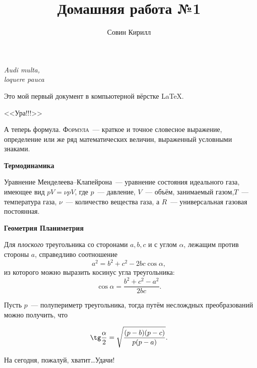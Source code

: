 \documentclass[12pt]{article}
\title{Домашняя работа №1}
\author{Совин Кирилл}
\date{}
\begin{document}
	\maketitle
	\begin{flushright}
		\textit{Audi multa,\\
			loquere pauca}	
	\end{flushright}

	\vspace{20pt}

	Это мой первый документ в компьютерной вёрстке \LaTeX.

	\begin{center}
		\huge{\textsf{<<Ура!!!>>} }\\
	\end{center}

	А теперь формула. \textsc{Формула}~--- краткое и точное словесное выражение, определение или же ряд математических величин, выраженный условными знаками.
	\vspace{15pt}

	\hspace{28pt}  {\Large\textbf{Термодинамика}}

	Уравнение Менделеева--Клапейрона~--- уравнение состояния идеального газа, имеющее вид $pV = \nu pV$, где $p$~--- давление, $V$~--- объём, занимаемый газом,$T$~--- температура газа, $\nu$~--- количество вещества газа, а $R$~--- универсальная газовая постоянная.
\vspace{15pt}

	\hspace{28pt}  {\Large\textbf{Геометрия \hfill Планиметрия}}
	
	Для \textit{плоского} треугольника со сторонами $a, b, c$ и с углом $\alpha$, лежащим против стороны $a$, справедливо соотношение
	$$
	a^2 = b^2 + c^2 - 2bc \cos \alpha,
	$$
	из которого можно выразить косинус угла треугольника:
	$$
	\cos \alpha =\frac {b^2 + c^2 - a^2} {2bc}.
	$$

	Пусть $p$~--- полупериметр треугольника, тогда путём неслождных преобразований можно получить, что

	$$
	\tg \frac \alpha 2 = \sqrt{\frac {(p - b)(p - c)} {p(p - a)} }.
	$$

	\begin{flushleft}
		На сегодня, пожалуй, хватит\dots Удачи!
	\end{flushleft}
\end{document}
